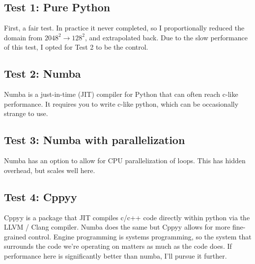 \documentclass[%
 reprint,
 amsmath,amssymb,
 aps,
showkeys,
]{revtex4-2}
\begin{document}


\subsection{Test 1: Pure Python}
First, a fair test. In practice it never completed, so I proportionally reduced the domain from $2048^2 \to 128^2$, and extrapolated back. Due to the slow performance of this test, I opted for Test 2 to be the control.

\subsection{Test 2: Numba}
Numba is a just-in-time (JIT) compiler for Python that can often reach c-like performance. It requires you to write c-like python, which can be occasionally strange to use. 

\subsection{Test 3: Numba with parallelization}
Numba has an option to allow for CPU parallelization of loops. This has hidden overhead, but scales well here.

\subsection{Test 4: Cppyy}
Cppyy is a package that JIT compiles c/c++ code directly within python via the LLVM / Clang compiler. Numba does the same but Cppyy allows for more fine-grained control. Engine programming is systems programming, so the system that surrounds the code we're operating on matters as much as the code does. If performance here is significantly better than numba, I'll pursue it further.
\end{document}
